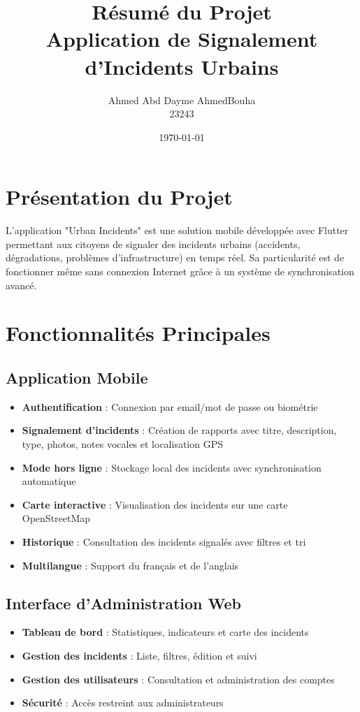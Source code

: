 \documentclass[12pt,a4paper]{article}
\title{\LARGE\textbf{Résumé du Projet\\Application de Signalement d'Incidents Urbains}}
\author{\Large Ahmed Abd Dayme AhmedBouha\\23243}
\date{\today}
\begin{document}
\maketitle

\section*{Présentation du Projet}

L'application "Urban Incidents" est une solution mobile développée avec Flutter permettant aux citoyens de signaler des incidents urbains (accidents, dégradations, problèmes d'infrastructure) en temps réel. Sa particularité est de fonctionner même sans connexion Internet grâce à un système de synchronisation avancé.

\section*{Fonctionnalités Principales}

\subsection*{Application Mobile}

\begin{itemize}
    \item \textbf{Authentification} : Connexion par email/mot de passe ou biométrie
    \item \textbf{Signalement d'incidents} : Création de rapports avec titre, description, type, photos, notes vocales et localisation GPS
    \item \textbf{Mode hors ligne} : Stockage local des incidents avec synchronisation automatique
    \item \textbf{Carte interactive} : Visualisation des incidents sur une carte OpenStreetMap
    \item \textbf{Historique} : Consultation des incidents signalés avec filtres et tri
    \item \textbf{Multilangue} : Support du français et de l'anglais
\end{itemize}

\subsection*{Interface d'Administration Web}

\begin{itemize}
    \item \textbf{Tableau de bord} : Statistiques, indicateurs et carte des incidents
    \item \textbf{Gestion des incidents} : Liste, filtres, édition et suivi
    \item \textbf{Gestion des utilisateurs} : Consultation et administration des comptes
    \item \textbf{Sécurité} : Accès restreint aux administrateurs
\end{itemize}
\end{document}
